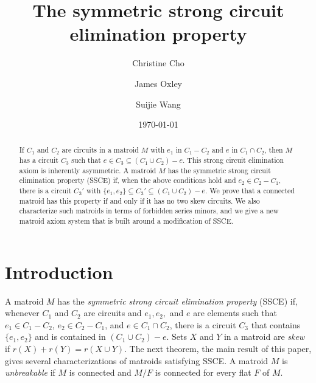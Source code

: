 \documentclass[12pt,reqno]{amsart}
\theoremstyle{definition}
\theoremstyle{remark}
\numberwithin{equation}{section}
\begin{document}
\title{The symmetric strong circuit elimination property}

\author{Christine Cho}
\address{Mathematics Department\\
  Louisiana State University\\
  Baton Rouge, Louisiana}

\author{James Oxley}
\address{Mathematics Department\\
  Louisiana State University\\
  Baton Rouge, Louisiana}

\author{Suijie Wang}
\address{School of Mathematics\\
  Hunan University\\
  Changsha 410082, Hunan, P. R. China}

\date{\today}

\begin{abstract}
    If $C_1$ and $C_2$ are circuits in a matroid $M$ with $e_1$ in $C_1-C_2$ and $e$ in $C_1\cap C_2$, then $M$ has a circuit $C_3$ such that $e\in C_3\subseteq (C_1\cup C_2)-e$. 
    This strong circuit elimination axiom is inherently asymmetric. 
    A matroid $M$ has the symmetric strong circuit elimination property (SSCE) if, when the above conditions hold and $e_2\in C_2-C_1$, there is a circuit $C_3'$ with $\{e_1,e_2\}\subseteq C_3'\subseteq (C_1\cup C_2)-e$.
    We prove that a  connected matroid has this property if and only if it has no two skew circuits.
    We also characterize such matroids in terms of forbidden series minors, and we give a new matroid axiom system that is built around a modification of SSCE. 
\end{abstract}
\maketitle

\section{Introduction}
A matroid $M$ has the \textit{symmetric strong circuit elimination property} (SSCE) if, whenever $C_1$ and $C_2$ are circuits and $e_1,e_2,$ and $e$ are elements such that $e_1\in C_1-C_2$, $e_2\in C_2-C_1$, and $e\in C_1\cap C_2$, there is a circuit $C_3$ that contains $\{e_1,e_2\}$ and is contained in $(C_1\cup C_2)-e$. 
Sets $X$ and $Y$ in a matroid are \textit{skew} if $r(X)+r(Y)=r(X\cup Y)$. 
The next theorem, the main result of this paper, gives several characterizations of matroids satisfying SSCE. 
A matroid $M$ is \textit{unbreakable} if $M$ is connected and $M/F$ is connected for every flat $F$ of $M$.
\end{document}
